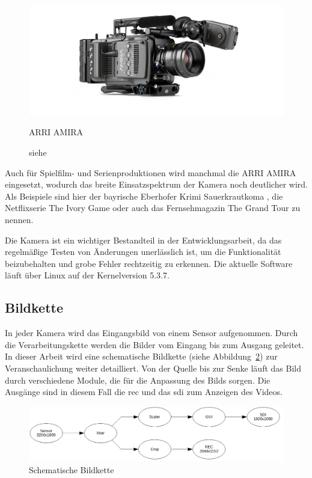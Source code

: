 \begin{figure}[!hbtp]
	\centering
	\includegraphics[width = 0.7\linewidth]{pictures/amira-product-image-data.jpg}
	\hspace*{0\textwidth}
	\caption{ARRI AMIRA}
	\caption*{siehe \cite{arriamira_bild}}
	\label{fig:amira}
\end{figure}  

Auch für Spielfilm- und Serienproduktionen wird  manchmal die \ac{ARRI} AMIRA eingesetzt, wodurch das breite Einsatzspektrum der Kamera noch deutlicher wird.
Als Beispiele sind hier der bayrische Eberhofer Krimi \glqq Sauerkrautkoma\grqq{} \cite{arrikrimi}, die Netflixserie \glqq The Ivory Game\grqq{} \cite{imdbivory} oder auch das Fernsehmagazin \glqq The Grand Tour\grqq{} \cite{imdbtour} zu nennen.
 
Die Kamera ist ein wichtiger Bestandteil in der Entwicklungsarbeit, da das regelmäßige Testen von Änderungen unerlässlich ist, um die Funktionalität beizubehalten und grobe Fehler rechtzeitig zu erkennen. Die aktuelle Software läuft über Linux auf der Kernelversion 5.3.7.

\subsection{Bildkette}\label{sec:bildkette}
In jeder Kamera wird das Eingangsbild von einem Sensor aufgenommen. Durch die Verarbeitungskette werden die Bilder vom Eingang bis zum Ausgang geleitet. In dieser Arbeit wird eine schematische Bildkette (siehe Abbildung~\ref{fig:bild}) zur Veranschaulichung weiter detailliert. Von der Quelle bis zur Senke läuft das Bild durch verschiedene Module, die für die Anpassung des Bilds sorgen. Die Ausgänge sind in diesem Fall die \ac{rec} und das \ac{sdi} zum Anzeigen des Videos.

\begin{figure}[!hbtp]
	\centering
	\includegraphics[width = \linewidth]{pictures/2019-11-17_Bildkette.png}
	\smallskip
	\caption{Schematische Bildkette}
	\label{fig:bild}
\end{figure} 

